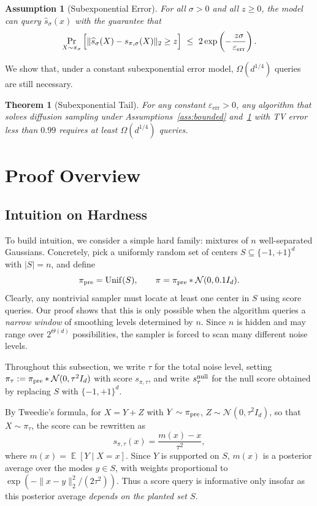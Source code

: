 \documentclass[11pt,letterpaper]{article}
\newtheorem{theorem}{Theorem}[section]
\newtheorem{assumption}{Assumption}
\DeclareMathOperator*{\E}{\mathbb{E}}
\newcommand{\1}{\mathbbm{1}}
\newcommand{\Hd}{\{-1,+1\}^d}
\DeclareMathOperator{\Unif}{Unif}
\begin{document}
\begin{assumption}[Subexponential Error]
\label{ass:psi1}
For all $\sigma > 0$ and all $z\ge 0$, the model can query $\widehat s_\sigma(x)$ with the guarantee that
\[
\Pr_{X\sim \pi_\sigma}\Big[\|\widehat s_\sigma(X)-s_{\pi,\sigma}(X)\|_2\ge z\Big]
\ \le\
2\exp\left(-\frac{z\sigma}{\varepsilon_{\rm err}}\right).
\]
\end{assumption}

We show that, under a constant subexponential error model, $\Omega(d^{1/4})$ queries are still necessary.


\begin{theorem}[Subexponential Tail]
  \label{thm:psi1_simplified}
  For any constant $\varepsilon_{\mathrm{err}} > 0$, any algorithm that solves diffusion sampling under Assumptions~\ref{ass:bounded} and~\ref{ass:psi1} with TV error less than $0.99$ requires at least $\Omega(d^{1/4})$ queries.
\end{theorem}


\section{Proof Overview}
\label{sec:overview}

\subsection{Intuition on Hardness}
\label{sec:intuition}
To build intuition, we consider a simple hard family: mixtures of $n$ well-separated Gaussians.
Concretely, pick a uniformly random set of centers $S\subseteq\Hd$ with $|S|=n$, and define
\[
\pi_{\rm pre}=\Unif(S), \qquad \pi=\pi_{\rm pre}*\mathcal N(0,0.1 I_d).
\]
Clearly, any nontrivial sampler must locate at least one center in $S$ using score queries.
Our proof shows that this is only possible when the algorithm queries a \emph{narrow window} of smoothing levels determined by $n$.
Since $n$ is hidden and may range over $2^{\Theta(d)}$ possibilities, the sampler is forced to scan many different noise levels.
 
{Throughout this subsection, we write $\tau$ for the total noise
level, setting $\pi_\tau := \pi_{\rm pre} * \mathcal N(0, \tau^2
I_d)$ with score $s_{\pi,\tau}$, and write $s^{\rm null}_\tau$
for the null score obtained by replacing $S$ with $\Hd$.}
 
By Tweedie's formula, for $X=Y+Z$ with $Y\sim\pi_{\rm pre}$, $Z\sim\mathcal{N}(0,\tau^2 I_d)$, so that $X\sim\pi_\tau$, the score can be rewritten as
\[
s_{\pi, {\tau}}(x)=\frac{m(x)-x}{ {\tau}^2},
\]
where $m(x) = \E[Y\mid X=x]$.
Since $Y$ is supported on $S$, $m(x)$ is a posterior average over the modes $y\in S$, with weights proportional to
$\exp(-\|x-y\|_2^2/(2 {\tau}^2))$.
Thus a score query is informative only insofar as this posterior average \emph{depends on the planted set $S$}.
 
\end{document}
